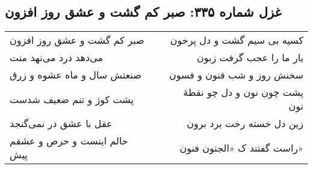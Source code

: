 \begin{center}
\section*{غزل شماره ۳۳۵: صبر کم گشت و عشق روز افزون}
\label{sec:335}
\begin{longtable}{l p{0.5cm} r}
صبر کم گشت و عشق روز افزون
&&
کسیه بی سیم گشت و دل پرخون
\\
می‌دهد درد می‌نهد منت
&&
یار ما را عجب گرفت زبون
\\
صنعتش سال و ماه عشوه و زرق
&&
سخنش روز و شب فنون و فسون
\\
پشت کوژ و تنم ضعیف شدست
&&
پشت چون نون و دل چو نقطهٔ نون
\\
عقل با عشق در نمی‌گنجد
&&
زین دل خسته رخت برد برون
\\
حالم اینست و حرص و عشقم پیش
&&
راست گفتند ک «الجنون فنون»
\\
\end{longtable}
\end{center}
